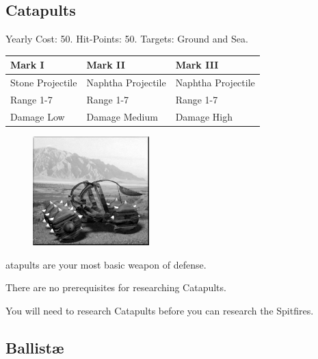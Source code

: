 \clearpage

\subsection{Catapults}


\begin{center}
	Yearly Cost: 50. Hit-Points: 50. Targets: Ground and Sea.
\end{center}

\begin{tabular}{ | p{1.3in} | p{1.3in} | p{1.3in} |}
	\hline
	\textbf{Mark I}	& \textbf{Mark II} & \textbf{Mark III} \\ \hline
	Stone Projectile	& Naphtha Projectile & Naphtha Projectile \\ \hline
	Range 1-7	& Range 1-7& Range 1-7 \\ \hline
	Damage Low	& Damage Medium & Damage High \\ \hline
\end{tabular}

\begin{figure}
	\vspace{-20pt}
	\begin{center}
		\includegraphics[width=0.4\textwidth]{Acatapult}
	\end{center}
	\vspace{-50pt}
\end{figure}

atapults are your most basic weapon of defense. 

There are no prerequisites for researching Catapults. 

You will need to research Catapults before you can research the Spitfires.

\subsection{Ballistæ}

